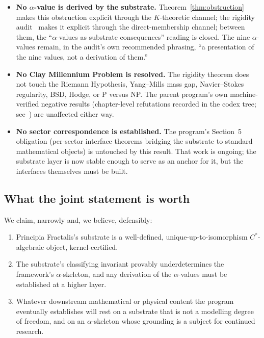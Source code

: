 \documentclass[11pt,a4paper]{article}
\theoremstyle{plain}
\theoremstyle{definition}
\begin{document}
\begin{itemize}[leftmargin=*]
  \item \textbf{No $\alpha$-value is derived by the substrate.} Theorem~\ref{thm:obstruction} makes this obstruction explicit through the $K$-theoretic channel; the rigidity audit~\cite{cohen_alpha_rigidity_2026} makes it explicit through the direct-membership channel; between them, the ``$\alpha$-values as substrate consequences'' reading is closed. The nine $\alpha$-values remain, in the audit's own recommended phrasing, ``a presentation of the nine values, not a derivation of them.''
  \item \textbf{No Clay Millennium Problem is resolved.} The rigidity theorem does not touch the Riemann Hypothesis, Yang--Mills mass gap, Navier--Stokes regularity, BSD, Hodge, or P versus NP. The parent program's own machine-verified negative results (chapter-level refutations recorded in the codex tree; see~\cite{cohen_pf_2026}) are unaffected either way.
  \item \textbf{No sector correspondence is established.} The program's Section~5 obligation (per-sector interface theorems bridging the substrate to standard mathematical objects) is untouched by this result. That work is ongoing; the substrate layer is now stable enough to serve as an anchor for it, but the interfaces themselves must be built.
\end{itemize}

\subsection*{What the joint statement is worth}

We claim, narrowly and, we believe, defensibly:
\begin{enumerate}[leftmargin=2em]
  \item Principia Fractalis's substrate is a well-defined, unique-up-to-isomorphism $C^{\ast}$-algebraic object, kernel-certified.
  \item The substrate's classifying invariant provably underdetermines the framework's $\alpha$-skeleton, and any derivation of the $\alpha$-values must be established at a higher layer.
  \item Whatever downstream mathematical or physical content the program eventually establishes will rest on a substrate that is not a modelling degree of freedom, and on an $\alpha$-skeleton whose grounding is a subject for continued research.
\end{enumerate}
\end{document}
